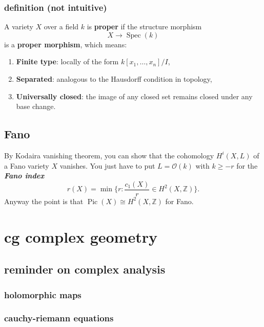 \subsection*{definition (not intuitive)}
A variety \( X \) over a field \( k \) is \textbf{proper} if the structure morphism
\[
X \to \operatorname{Spec}(k)
\]
is a \textbf{proper morphism}, which means:
\begin{enumerate}
  \item \textbf{Finite type}: locally of the form \( k[x_1, \dots, x_n]/I \),
  \item \textbf{Separated}: analogous to the Hausdorff condition in topology,
  \item \textbf{Universally closed}: the image of any closed set remains closed under any base change.
\end{enumerate}

\section{Fano}

\begin{exercise}\leavevmode
By Kodaira vanishing theorem, you can show that the cohomology \(H^{i}(X,L)\) of a Fano variety \(X\) vanishes. You just have to put \(L=\mathcal{O}(k)\) with \(k\geq  -r\) for the \textit{\textbf{Fano index}} 
\[r(X)=\operatorname{min}\{r:\frac{c_1(X)}{r}\in H^{2}(X,\mathbb{Z})\}.\]
Anyway the point is that \(\operatorname{Pic}(X)\cong H^{2}(X,\mathbb{Z})\) for Fano.
\end{exercise}



\chapter{cg complex geometry}

\section{reminder on complex analysis}

\subsection{holomorphic maps}


\subsection{cauchy-riemann equations}

